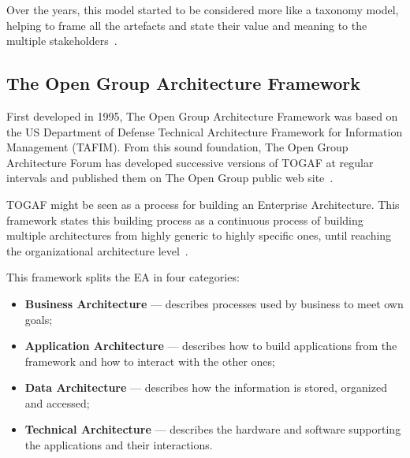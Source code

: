 

Over the years, this model started to be considered more like a taxonomy model, helping to frame all the artefacts and state their value and meaning to the multiple stakeholders~\citep{Sessions2007}.






\subsection{The Open Group Architecture Framework} \label{sec:togaf}

First developed in 1995, The Open Group Architecture Framework was based on the US Department of Defense Technical Architecture Framework for Information Management (TAFIM). From this sound foundation, The Open Group Architecture Forum has developed successive versions of TOGAF at regular intervals and published them on The Open Group public web site~\citep{Josey2011}.

TOGAF might be seen as a process for building an Enterprise Architecture. This framework states this building process as a continuous process of building multiple architectures from highly generic to highly specific ones, until reaching the organizational architecture level~\citep{Sessions2007}.

This framework splits the EA in four categories: 
\begin{itemize}
\item \textbf{Business Architecture} --- describes processes used by business to meet own goals;
\item \textbf{Application Architecture} --- describes how to build applications from the framework and how to interact with the other ones;
\item \textbf{Data Architecture} --- describes how the information is stored, organized and accessed;
\item \textbf{Technical Architecture} --- describes the hardware and software supporting the applications and their interactions.
\end{itemize}

